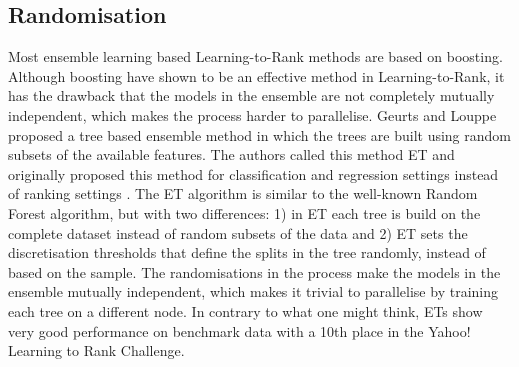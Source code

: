 \subsection{Randomisation}
Most ensemble learning based Learning-to-Rank methods are based on boosting. Although boosting have shown to be an effective method in Learning-to-Rank, it has the drawback that the models in the ensemble are not completely mutually independent, which makes the process harder to parallelise. Geurts and Louppe \cite{Geurts2011} proposed a tree based ensemble method in which the trees are built using random subsets of the available features. The authors called this method \ac{ET} and originally proposed this method for classification and regression settings instead of ranking settings \cite{Geurts2006}. The \ac{ET} algorithm is similar to the well-known Random Forest algorithm, but with two differences: 1) in \ac{ET} each tree is build on the complete dataset instead of random subsets of the data and 2) \ac{ET} sets the discretisation thresholds that define the splits in the tree randomly, instead of based on the sample. The randomisations in the process make the models in the ensemble mutually independent, which makes it trivial to parallelise by training each tree on a different node. In contrary to what one might think, \ac{ET}s show very good performance on benchmark data with a 10th place in the Yahoo! Learning to Rank Challenge.\\